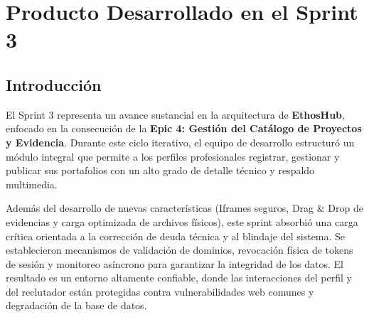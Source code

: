 \chapter{Producto Desarrollado en el Sprint 3}
\label{chap:sprint3}

\section{Introducción}
\label{sec:intro_sprint3}

El Sprint 3 representa un avance sustancial en la arquitectura de \textbf{EthosHub}, enfocado en la consecución de la \textbf{Epic 4: Gestión del Catálogo de Proyectos y Evidencia}. Durante este ciclo iterativo, el equipo de desarrollo estructuró un módulo integral que permite a los perfiles profesionales registrar, gestionar y publicar sus portafolios con un alto grado de detalle técnico y respaldo multimedia.

Además del desarrollo de nuevas características (Iframes seguros, Drag \& Drop de evidencias y carga optimizada de archivos físicos), este sprint absorbió una carga crítica orientada a la corrección de deuda técnica y al blindaje del sistema. Se establecieron mecanismos de validación de dominios, revocación física de tokens de sesión y monitoreo asíncrono para garantizar la integridad de los datos. El resultado es un entorno altamente confiable, donde las interacciones del perfil y del reclutador están protegidas contra vulnerabilidades web comunes y degradación de la base de datos.